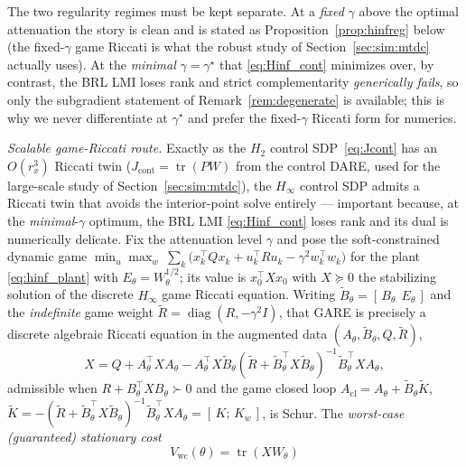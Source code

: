 \documentclass[twocolumn,amsthm]{autart}
\begin{document}
\begin{rem}\label{rem:hinfreg}
The two regularity regimes must be kept separate. At a \emph{fixed} $\gamma$ above
the optimal attenuation the story is clean and is stated as
Proposition~\ref{prop:hinfreg} below (the fixed-$\gamma$ game Riccati is what the
robust study of Section~\ref{sec:sim:mtdc} actually uses). At the \emph{minimal}
$\gamma=\gamma^\star$ that \eqref{eq:Hinf_cont} minimizes over, by contrast, the
BRL LMI loses rank and strict complementarity \emph{generically fails}, so only
the subgradient statement of Remark~\ref{rem:degenerate} is available; this is why
we never differentiate at $\gamma^\star$ and prefer the fixed-$\gamma$ Riccati
form for numerics.
\end{rem}

\emph{Scalable game-Riccati route.} Exactly as the $H_2$ control SDP~\eqref{eq:Jcont}
has an $O(r_x^3)$ Riccati twin ($J_{\mathrm{cont}}=\operatorname{tr}(PW)$ from the
control DARE, used for the large-scale study of
Section~\ref{sec:sim:mtdc}), the $H_\infty$ control SDP admits a Riccati twin that
avoids the interior-point solve entirely --- important because, at the
\emph{minimal}-$\gamma$ optimum, the BRL LMI \eqref{eq:Hinf_cont} loses rank and its
dual is numerically delicate. Fix the attenuation level $\gamma$ and pose the
soft-constrained dynamic game
$\min_u\max_w\ \sum_k\big(x_k^\top Qx_k+u_k^\top Ru_k-\gamma^2 w_k^\top w_k\big)$
for the plant \eqref{eq:hinf_plant} with $E_\theta=W_\theta^{1/2}$; its value is
$x_0^\top X x_0$ with $X\succeq0$ the stabilizing solution of the discrete
$H_\infty$ game Riccati equation. Writing $\tilde B_\theta=[\,B_\theta\ \ E_\theta\,]$
and the \emph{indefinite} game weight
$\tilde R=\operatorname{diag}(R,-\gamma^2 I)$, that GARE is precisely a discrete
algebraic Riccati equation in the augmented data $(A_\theta,\tilde B_\theta,Q,\tilde R)$,
\begin{equation}\label{eq:gare}
X = Q + A_\theta^\top X A_\theta
 - A_\theta^\top X\tilde B_\theta(\tilde R+\tilde B_\theta^\top X\tilde B_\theta)^{-1}
   \tilde B_\theta^\top X A_\theta,
\end{equation}
admissible when $R+B_\theta^\top X B_\theta\succ0$ and the game closed loop
$A_{\mathrm{cl}}=A_\theta+\tilde B_\theta\tilde K$,
$\tilde K=-(\tilde R+\tilde B_\theta^\top X\tilde B_\theta)^{-1}\tilde B_\theta^\top X A_\theta
=[\,K;\,K_w\,]$, is Schur. The \emph{worst-case (guaranteed) stationary cost}
\begin{equation}\label{eq:hinf_value}
V_{\mathrm{wc}}(\theta) = \operatorname{tr}(X W_\theta)
\end{equation}
\end{document}
